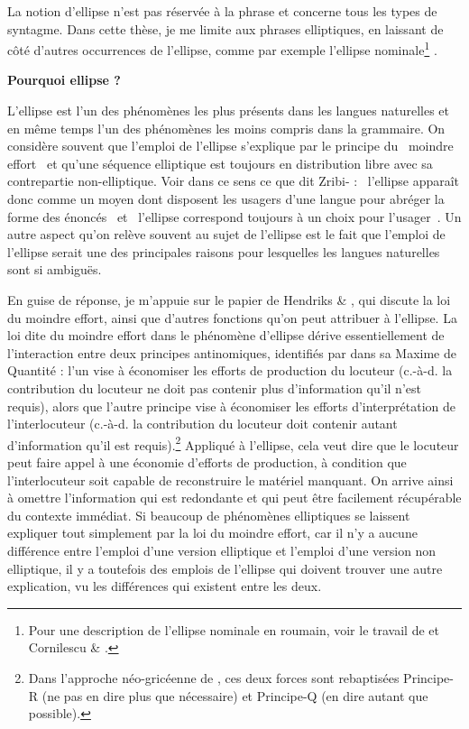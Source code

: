 La notion d'ellipse n'est pas réservée à la phrase et concerne tous les types de syntagme. Dans cette thèse, je me limite aux phrases elliptiques, en laissant de côté d'autres occurrences de l'ellipse, comme par exemple l'ellipse nominale\footnote{Pour une description de l'ellipse nominale en roumain, voir le travail de \citet{Giurgea2010} et Cornilescu \& \citet{Nicolae2010}.} . 

{\bfseries
Pourquoi ellipse ?} 

L'ellipse est l'un des phénomènes les plus présents dans les langues naturelles et en même temps l'un des phénomènes les moins compris dans la grammaire. On considère souvent que l'emploi de l'ellipse s'explique par le principe du {\guillemotleft}~moindre effort~{\guillemotright} et qu'une séquence elliptique est toujours en distribution libre avec sa contrepartie non-elliptique. Voir dans ce sens ce que dit Zribi-\citet[377]{Hertz1986} : {\guillemotleft}~l'ellipse apparaît donc comme un moyen dont disposent les usagers d'une langue pour abréger la forme des énoncés~{\guillemotright} et {\guillemotleft}~l'ellipse correspond toujours à un choix pour l'usager~{\guillemotright}. Un autre aspect qu'on relève souvent au sujet de l'ellipse est le fait que l'emploi de l'ellipse serait une des principales raisons pour lesquelles les langues naturelles sont si ambiguës. 

En guise de réponse, je m'appuie sur le papier de Hendriks \& \citet{Spenader2005}, qui discute la loi du moindre effort, ainsi que d'autres fonctions qu'on peut attribuer à l'ellipse. La loi dite du moindre effort dans le phénomène d'ellipse dérive essentiellement de l'interaction entre deux principes antinomiques, identifiés par \citet{Grice1968} dans sa Maxime de Quantité : l'un vise à économiser les efforts de production du locuteur (c.-à-d. la contribution du locuteur ne doit pas contenir plus d'information qu'il n'est requis), alors que l'autre principe vise à économiser les efforts d'interprétation de l'interlocuteur (c.-à-d. la contribution du locuteur doit contenir autant d'information qu'il est requis).\footnote{Dans l'approche néo-gricéenne de \citet{Horn1993}, ces deux forces sont rebaptisées Principe-R (ne pas en dire plus que nécessaire) et  Principe-Q (en dire autant que possible).} Appliqué à l'ellipse, cela veut dire que le locuteur peut faire appel à une économie d'efforts de production, à condition que l'interlocuteur soit capable de reconstruire le matériel manquant. On arrive ainsi à omettre l'information qui est redondante et qui peut être facilement récupérable du contexte immédiat. Si beaucoup de phénomènes elliptiques se laissent expliquer tout simplement par la loi du moindre effort, car il n'y a aucune différence entre l'emploi d'une version elliptique et l'emploi d'une version non elliptique, il y a toutefois des emplois de l'ellipse qui doivent trouver une autre explication, vu les différences qui existent entre les deux. 

